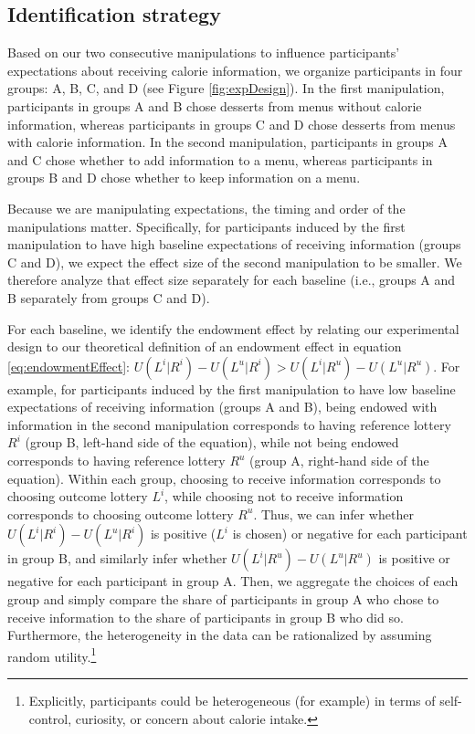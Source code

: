 \subsection{Identification strategy}

Based on our two consecutive manipulations to influence participants’ expectations about receiving calorie information, we organize participants in four groups: A, B, C, and D (see Figure \ref{fig:expDesign}). In the first manipulation, participants in groups A and B chose desserts from menus without calorie information, whereas participants in groups C and D chose desserts from menus with calorie information. In the second manipulation, participants in groups A and C chose whether to add information to a menu, whereas participants in groups B and D chose whether to keep information on a menu.

Because we are manipulating expectations, the timing and order of the manipulations matter. Specifically, for participants induced by the first manipulation to have high baseline expectations of receiving information (groups C and D), we expect the effect size of the second manipulation to be smaller. We therefore analyze that effect size separately for each baseline (i.e., groups A and B separately from groups C and D).

For each baseline, we identify the endowment effect by relating our experimental design to our theoretical definition of an endowment effect in equation \ref{eq:endowmentEffect}: $U(L^i|R^i)-U(L^u|R^i)>U(L^i|R^u)-U(L^u|R^u)$. For example, for participants induced by the first manipulation to have low baseline expectations of receiving information (groups A and B), being endowed with information in the second manipulation corresponds to having reference lottery $R^i$ (group B, left-hand side of the equation), while not being endowed corresponds to having reference lottery $R^u$ (group A, right-hand side of the equation). Within each group, choosing to receive information corresponds to choosing outcome lottery $L^i$, while choosing not to receive information corresponds to choosing outcome lottery $R^u$. Thus, we can infer whether $U(L^i|R^i)-U(L^u|R^i)$ is positive ($L^i$ is chosen) or negative for each participant in group B, and similarly infer whether $U(L^i|R^u)-U(L^u|R^u)$ is positive or negative for each participant in group A. Then, we aggregate the choices of each group and simply compare the share of participants in group A who chose to receive information to the share of participants in group B who did so. Furthermore, the heterogeneity in the data can be rationalized by assuming random utility.\footnote{Explicitly, participants could be heterogeneous (for example) in terms of self-control, curiosity, or concern about calorie intake.}

